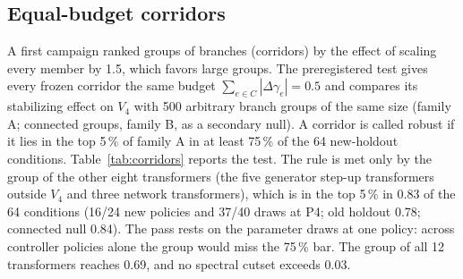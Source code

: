 \subsection{Equal-budget corridors}\label{sec:corr}
A first campaign ranked groups of branches (corridors) by the effect of scaling every member by 1.5, which favors large groups. The preregistered test gives every frozen corridor the same budget $\sum_{e\in C}|\Delta\gamma_e|=0.5$ and compares its stabilizing effect on $V_4$ with 500 arbitrary branch groups of the same size (family A; connected groups, family B, as a secondary null). A corridor is called robust if it lies in the top 5\,\% of family A in at least 75\,\% of the 64 new-holdout conditions.
Table~\ref{tab:corridors} reports the test. The rule is met only by the group of the other eight transformers (the five generator step-up transformers outside $V_4$ and three network transformers), which is in the top 5\,\% in 0.83 of the 64 conditions (16/24 new policies and 37/40 draws at P4; old holdout 0.78; connected null 0.84). The pass rests on the parameter draws at one policy: across controller policies alone the group would miss the 75\,\% bar. The group of all 12 transformers reaches 0.69, and no spectral cutset exceeds 0.03.


